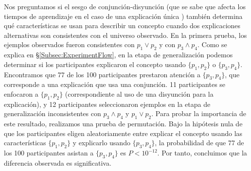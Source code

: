 Nos preguntamos si el sesgo de conjunción-disyunción (que se sabe que afecta los tiempos de aprendizaje en el caso de una explicación única \cite{bourne1970knowing}) también determina qué características se usan para describir un concepto cuando dos explicaciones alternativas son consistentes con el universo observado. En la primera prueba, los ejemplos observados fueron consistentes con $ p_1 \vee p_2 $ y con $ p_3 \wedge p_4 $. Como se explica en \S\ref{Subsec:ExperimentFlow}, en la etapa de generalización podemos determinar si los participantes explicaron el concepto usando $ \{p_1, p_2 \} $ o $ \{p_3, p_4 \} $. Encontramos que 77 de los 100 participantes prestaron atención a $ \{p_3, p_4 \} $, que corresponde a una explicación que usa una conjunción. 11 participantes se enfocaron a $ \{p_1, p_2 \} $ (correspondiente al uso de una disyunción para la explicación), y 12 participantes seleccionaron ejemplos en la etapa de generalización inconsistentes con $ p_3 \wedge p_4 $ y $ p_1 \vee p_2$. Para probar la importancia de este resultado, realizamos una prueba de permutación. Bajo la hipótesis nula de que los participantes eligen aleatoriamente entre explicar el concepto usando las características $ \{p_1, p_2 \} $ y explicarlo usando $ \{p_3, p_4 \} $, la probabilidad de que 77 de los 100 participantes asistan a $ \{ p_3, p_4 \} $ es $ P <10^{-12} $. Por tanto, concluimos que la diferencia observada es significativa.

